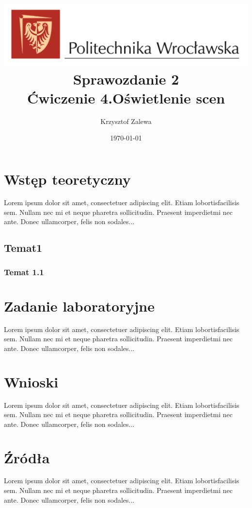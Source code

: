 \documentclass{article}
\title{
  \centering
  \includegraphics[width=\textwidth]{images/logo_PWr_kolor_poziom.png}\\
  \fontsize{28pt}{30pt}\selectfont Sprawozdanie 2\\
  \fontsize{14pt}{30pt}\selectfont Ćwiczenie 4.Oświetlenie scen}
\author{Krzysztof Zalewa}
\date{\daymonthyear\today}
\begin{document}
  \maketitle
  \pagebreak
  \tableofcontents
  
  \section{Wstęp teoretyczny}
  Lorem  ipsum  dolor  sit  amet,  consectetuer  adipiscing  
  elit.   Etiam  lobortisfacilisis sem.  Nullam nec mi et 
  neque pharetra sollicitudin.  Praesent imperdietmi nec ante. 
  Donec ullamcorper, felis non sodales...
  \subsection{Temat1}
  \subsubsection{Temat 1.1}

  \section{Zadanie laboratoryjne}
  Lorem  ipsum  dolor  sit  amet,  consectetuer  adipiscing  
  elit.   Etiam  lobortisfacilisis sem.  Nullam nec mi et 
  neque pharetra sollicitudin.  Praesent imperdietmi nec ante. 
  Donec ullamcorper, felis non sodales...

  \section{Wnioski}
  Lorem  ipsum  dolor  sit  amet,  consectetuer  adipiscing  
  elit.   Etiam  lobortisfacilisis sem.  Nullam nec mi et 
  neque pharetra sollicitudin.  Praesent imperdietmi nec ante. 
  Donec ullamcorper, felis non sodales...
  
  \section{Źródła}
  Lorem  ipsum  dolor  sit  amet,  consectetuer  adipiscing  
  elit.   Etiam  lobortisfacilisis sem.  Nullam nec mi et 
  neque pharetra sollicitudin.  Praesent imperdietmi nec ante. 
  Donec ullamcorper, felis non sodales...
\end{document}
